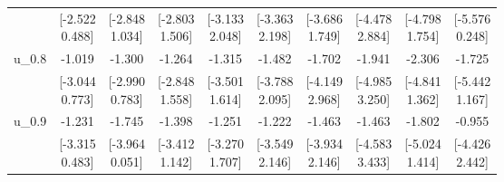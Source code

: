 {\begin{tabular}{lccccccccc}
 & \shortstack{[-2.522\\0.488]} & \shortstack{[-2.848\\1.034]} & \shortstack{[-2.803\\1.506]} & \shortstack{[-3.133\\2.048]} & \shortstack{[-3.363\\2.198]} & \shortstack{[-3.686\\1.749]} & \shortstack{[-4.478\\2.884]} & \shortstack{[-4.798\\1.754]} & \shortstack{[-5.576\\0.248]} \\[0.25em]
u\_0.8 & -1.019 & -1.300 & -1.264 & -1.315 & -1.482 & -1.702 & -1.941 & -2.306 & -1.725 \\
 & \shortstack{[-3.044\\0.773]} & \shortstack{[-2.990\\0.783]} & \shortstack{[-2.848\\1.558]} & \shortstack{[-3.501\\1.614]} & \shortstack{[-3.788\\2.095]} & \shortstack{[-4.149\\2.968]} & \shortstack{[-4.985\\3.250]} & \shortstack{[-4.841\\1.362]} & \shortstack{[-5.442\\1.167]} \\[0.25em]
u\_0.9 & -1.231 & -1.745 & -1.398 & -1.251 & -1.222 & -1.463 & -1.463 & -1.802 & -0.955 \\
 & \shortstack{[-3.315\\0.483]} & \shortstack{[-3.964\\0.051]} & \shortstack{[-3.412\\1.142]} & \shortstack{[-3.270\\1.707]} & \shortstack{[-3.549\\2.146]} & \shortstack{[-3.934\\2.146]} & \shortstack{[-4.583\\3.433]} & \shortstack{[-5.024\\1.414]} & \shortstack{[-4.426\\2.442]} \\[0.25em]
\bottomrule
\end{tabular}
}
